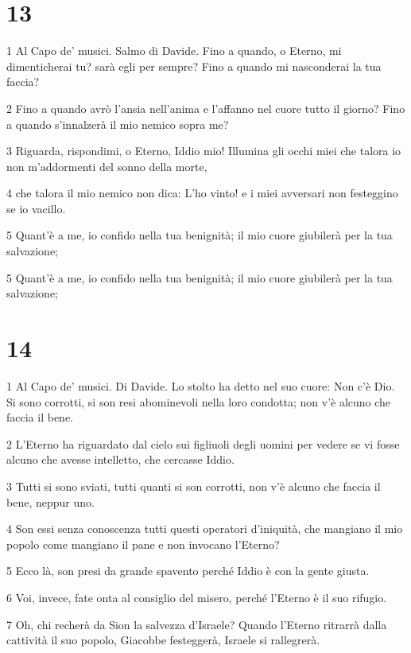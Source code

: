 \chapter{13}

\par 1 Al Capo de' musici. Salmo di Davide. Fino a quando, o Eterno, mi dimenticherai tu? sarà egli per sempre? Fino a quando mi nasconderai la tua faccia?
\par 2 Fino a quando avrò l'ansia nell'anima e l'affanno nel cuore tutto il giorno? Fino a quando s'innalzerà il mio nemico sopra me?
\par 3 Riguarda, rispondimi, o Eterno, Iddio mio! Illumina gli occhi miei che talora io non m'addormenti del sonno della morte,
\par 4 che talora il mio nemico non dica: L'ho vinto! e i miei avversari non festeggino se io vacillo.
\par 5 Quant'è a me, io confido nella tua benignità; il mio cuore giubilerà per la tua salvazione;
\par 5 Quant'è a me, io confido nella tua benignità; il mio cuore giubilerà per la tua salvazione;

\chapter{14}

\par 1 Al Capo de' musici. Di Davide. Lo stolto ha detto nel suo cuore: Non c'è Dio. Si sono corrotti, si son resi abominevoli nella loro condotta; non v'è alcuno che faccia il bene.
\par 2 L'Eterno ha riguardato dal cielo sui figliuoli degli uomini per vedere se vi fosse alcuno che avesse intelletto, che cercasse Iddio.
\par 3 Tutti si sono sviati, tutti quanti si son corrotti, non v'è alcuno che faccia il bene, neppur uno.
\par 4 Son essi senza conoscenza tutti questi operatori d'iniquità, che mangiano il mio popolo come mangiano il pane e non invocano l'Eterno?
\par 5 Ecco là, son presi da grande spavento perché Iddio è con la gente giusta.
\par 6 Voi, invece, fate onta al consiglio del misero, perché l'Eterno è il suo rifugio.
\par 7 Oh, chi recherà da Sion la salvezza d'Israele? Quando l'Eterno ritrarrà dalla cattività il suo popolo, Giacobbe festeggerà, Israele si rallegrerà.

